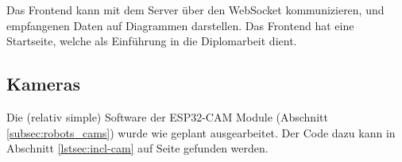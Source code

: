 Das Frontend kann mit dem Server über den WebSocket kommunizieren,
und empfangenen Daten auf Diagrammen darstellen. 
%
Das Frontend hat eine Startseite, welche als Einführung in die Diplomarbeit dient.

\subsection{Kameras}
Die (relativ simple) Software der ESP32-CAM Module (Abschnitt \ref{subsec:robots_cams})
wurde wie geplant ausgearbeitet.
%
Der Code dazu kann in Abschnitt \ref{lstsec:incl-cam} auf Seite \pageref{lstsec:incl-cam} gefunden werden.